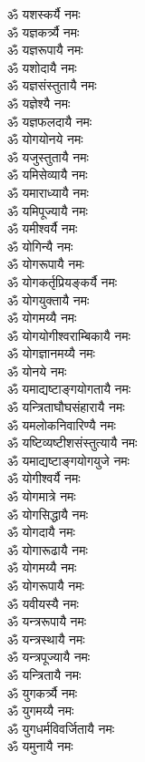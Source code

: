 \begin{flushleft}
\begin{multicols}{2}
ॐ यशस्कर्यै नमः\\
ॐ यज्ञकर्त्र्यै नमः\\
ॐ यज्ञरूपायै नमः\\
ॐ यशोदायै नमः\hfill{}\\
ॐ यज्ञसंस्तुतायै नमः\\
ॐ यज्ञेश्यै नमः\\
ॐ यज्ञफलदायै नमः\\
ॐ योगयोनये नमः\\
ॐ यजुस्तुतायै नमः\\
ॐ यमिसेव्यायै नमः\\
ॐ यमाराध्यायै नमः\\
ॐ यमिपूज्यायै नमः\\
ॐ यमीश्वर्यै नमः\\
ॐ योगिन्यै नमः\hfill{}\\
ॐ योगरूपायै नमः\\
ॐ योगकर्तृप्रियङ्कर्यै नमः\\
ॐ योगयुक्तायै नमः\\
ॐ योगमय्यै नमः\\
ॐ योगयोगीश्वराम्बिकायै नमः\\
ॐ योगज्ञानमय्यै नमः\\
ॐ योनये नमः\\
ॐ यमाद्यष्टाङ्गयोगतायै नमः\\
ॐ यन्त्रिताघौघसंहारायै नमः\\
ॐ यमलोकनिवारिण्यै नमः\hfill{}\\
ॐ यष्टिव्यष्टीशसंस्तुत्यायै नमः\\
ॐ यमाद्यष्टाङ्गयोगयुजे नमः\\
ॐ योगीश्वर्यै नमः\\
ॐ योगमात्रे नमः\\
ॐ योगसिद्धायै नमः\\
ॐ योगदायै नमः\\
ॐ योगारूढायै नमः\\
ॐ योगमय्यै नमः\\
ॐ योगरूपायै नमः\\
ॐ यवीयस्यै नमः\hfill{}\\
ॐ यन्त्ररूपायै नमः\\
ॐ यन्त्रस्थायै नमः\\
ॐ यन्त्रपूज्यायै नमः\\
ॐ यन्त्रितायै नमः\\
ॐ युगकर्त्र्यै नमः\\
ॐ युगमय्यै नमः\\
ॐ युगधर्मविवर्जितायै नमः\\
ॐ यमुनायै नमः\\

\end{multicols}
\end{flushleft}
